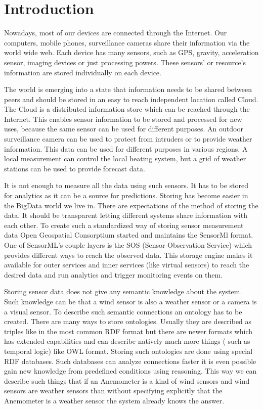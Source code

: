 \chapter*{Introduction}

Nowadays, most of our devices are connected through the Internet. Our computers, mobile phones, surveillance cameras share their information via the world wide web. Each device has many sensors, such as GPS, gravity, acceleration sensor, imaging devices or just processing powers. These sensors' or resource's information are stored individually on each device. 

The world is emerging into a state that information needs to be shared between peers and should be stored in an easy to reach independent location called Cloud. The Cloud is a distributed information store which can be reached through the Internet.
This enables sensor information to be stored and processed for new uses, because the same sensor can be used for different purposes. An outdoor surveillance camera can be used to protect from intruders or to provide weather information. This data can be used for different purposes in various regions. A local measurement can control the local heating system, but a grid of weather stations can be used to provide forecast data.
 
 It is not enough to measure all the data using such sensors. It has to be stored for analytics as it can be a source for predictions. Storing has become easier in the BigData world we live in. There are expectations of the method of storing the data. It should be transparent letting different systems share information with each other. To create such a standardized way of storing sensor measurement data Open Geospatial Consorptium started and maintains the SensorMl format. One of SensorML's couple layers is the SOS (Sensor Observation Service) which provides different ways to reach the observed data. This storage engine makes it available for outer services and inner services (like virtual sensors) to reach the desired data and run analytics and trigger monitoring events on them.

Storing sensor data does not give any semantic knowledge about the system. Such knowledge can be that a wind sensor is also a weather sensor or a camera is a visual sensor. To describe such semantic connections an ontology has to be created. There are many ways to store ontologies. Usually they are described as triples like in the most common RDF format but there are newer formats which has extended capabilities and can describe natively much more things ( such as temporal logic) like OWL format. Storing such ontologies are done using special RDF databases. Such databases can analyze connections faster it is even possible gain new knowledge from predefined conditions using reasoning. This way we can describe such things that if an Anemometer is a kind of wind sensors and wind sensors are weather sensors than without specifying explicitly that the Anemometer is a weather sensor the system already knows the answer. 

